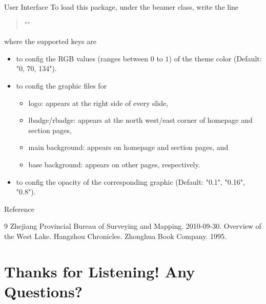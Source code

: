 \documentclass[handout, svgnames, aspectratio = 1610]{beamer}
\providecommand \pkg {\textsf}
\DeclareRobustCommand \meta[1]
  {\itshape \ensuremath \langle #1\/\ensuremath \rangle \upshape}
\begin{document}
\begin{frame}[t, fragile]{User Interface}
  To load this package, under the \pkg{beamer} class, write the line\par
  \begin{quote}
    "\usetheme["\meta{keys}"]{westlake}"
  \end{quote}\par
  where the supported keys are
  \begin{itemize}
    \item {} to config the RGB values
    (ranges between $0$ to $1$) of the theme color
    (Default: "{0, 70, 134}").
    \item {} to config the
    graphic files for
    \begin{itemize}
      \item logo: appears at the right side of every slide,
      \item lbadge/rbadge: appears at the north west/east corner of homepage
      and section pages,
      \item main background: appears on homepage and section pages, and
      \item base background: appears on other pages, respectively.
    \end{itemize}
    \item {} to config the
    opacity of the corresponding graphic (Default: "0.1", "0.16", "0.8").
  \end{itemize}
  { Reference}
  \begin{thebibliography}{9}
    Zhejiang Provincial Bureau of Surveying and Mapping. 2010-09-30.
    Overview of the West Lake. Hangzhou Chronicles.
    Zhonghua Book Company. 1995.
  \end{thebibliography}
\end{frame}

\section{Thanks for Listening! Any Questions?}
\end{document}
